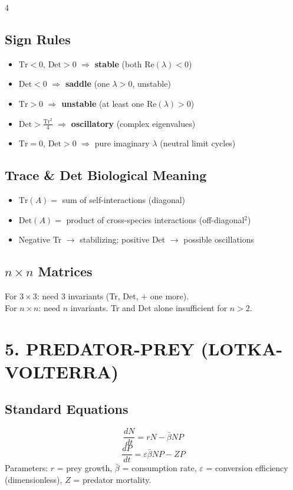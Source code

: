 \documentclass[8pt,landscape]{article}
\begin{document}
\begin{multicols}{4}
\subsection{Sign Rules}
\begin{itemize}
  \item $\text{Tr} < 0$, $\text{Det} > 0$ $\Rightarrow$ \textbf{stable} (both $\text{Re}(\lambda) < 0$)
  \item $\text{Det} < 0$ $\Rightarrow$ \textbf{saddle} (one $\lambda > 0$, unstable)
  \item $\text{Tr} > 0$ $\Rightarrow$ \textbf{unstable} (at least one $\text{Re}(\lambda) > 0$)
  \item $\text{Det} > \frac{\text{Tr}^2}{4}$ $\Rightarrow$ \textbf{oscillatory} (complex eigenvalues)
  \item $\text{Tr} = 0$, $\text{Det} > 0$ $\Rightarrow$ pure imaginary $\lambda$ (neutral limit cycles)
\end{itemize}

\subsection{Trace \& Det Biological Meaning}
\begin{itemize}
  \item $\text{Tr}(A) = $ sum of self-interactions (diagonal)
  \item $\text{Det}(A) = $ product of cross-species interactions (off-diagonal$^2$)
  \item Negative Tr $\to$ stabilizing; positive Det $\to$ possible oscillations
\end{itemize}

\subsection{$n\times n$ Matrices}
For $3 \times 3$: need 3 invariants (Tr, Det, $+ $ one more).\\
For $n\times n$: need $n$ invariants. Tr and Det alone insufficient for $n>2$.

\section{5. PREDATOR-PREY (LOTKA-VOLTERRA)}

\subsection{Standard Equations}
\[
\frac{dN}{dt} = rN - \bar{\beta}NP
\]
\[
\frac{dP}{dt} = \varepsilon\bar{\beta}NP - ZP
\]
Parameters: $r$ = prey growth, $\bar{\beta}$ = consumption rate, $\varepsilon$ = conversion efficiency (dimensionless), $Z$ = predator mortality.


\end{multicols}
\end{document}
